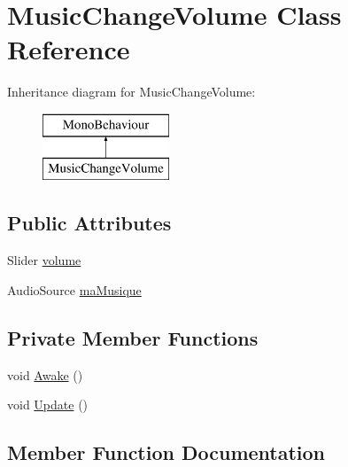 \hypertarget{class_music_change_volume}{}\section{Music\+Change\+Volume Class Reference}
\label{class_music_change_volume}
Inheritance diagram for Music\+Change\+Volume\+:\begin{figure}[H]
\begin{center}
\leavevmode
\includegraphics[height=2.000000cm]{class_music_change_volume}
\end{center}
\end{figure}
\subsection*{Public Attributes}
\begin{DoxyCompactItemize}
\item 
Slider \mbox{\hyperlink{class_music_change_volume_a14400f74c496eb4aef898efc2cc87239}{volume}}
\item 
Audio\+Source \mbox{\hyperlink{class_music_change_volume_a04507c692c3c6116a349701b71049073}{ma\+Musique}}
\end{DoxyCompactItemize}
\subsection*{Private Member Functions}
\begin{DoxyCompactItemize}
\item 
void \mbox{\hyperlink{class_music_change_volume_a8bb5e59cde2cd4b7622072ea90488efd}{Awake}} ()
\item 
void \mbox{\hyperlink{class_music_change_volume_ae95b01bb297e22f730fce5bf8f8e7551}{Update}} ()
\end{DoxyCompactItemize}


\subsection{Member Function Documentation}
\mbox{\label{class_music_change_volume_a8bb5e59cde2cd4b7622072ea90488efd}} 

